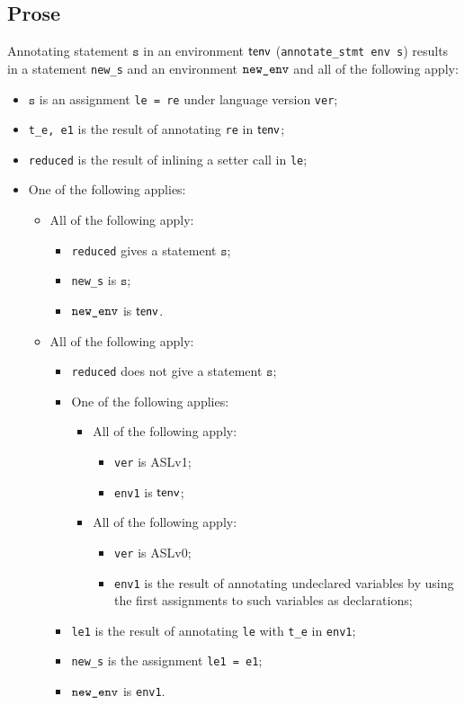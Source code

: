 \documentclass{book}
\newcommand\vs[0]{\texttt{s}}
\begin{document}
  \subsection{Prose}
Annotating statement $\vs$ in an environment $\textsf{tenv}$
(\texttt{annotate\_stmt env s}) results in a statement \texttt{new\_s} and an
environment $\texttt{new\_env}$ and all of the following apply:
   \begin{itemize}
   \item $\vs$ is an assignment \texttt{le = re} under language version \texttt{ver};
   \item \texttt{t\_e, e1} is the result of annotating \texttt{re} in $\textsf{tenv}$;
   \item \texttt{reduced} is the result of inlining a setter call in \texttt{le};
   \item One of the following applies:
     \begin{itemize}
     \item All of the following apply:
       \begin{itemize}
       \item \texttt{reduced} gives a statement $\vs$;
       \item \texttt{new\_s} is $\vs$;
       \item $\texttt{new\_env}$ is $\textsf{tenv}$.
       \end{itemize}

     \item All of the following apply:
       \begin{itemize}
       \item \texttt{reduced} does not give a statement $\vs$;
       \item One of the following applies:
         \begin{itemize}
         \item All of the following apply:
           \begin{itemize}
           \item \texttt{ver} is ASLv1;
           \item \texttt{env1} is $\textsf{tenv}$;
           \end{itemize}
         \item All of the following apply:
           \begin{itemize}
           \item \texttt{ver} is ASLv0;
	   \item \texttt{env1} is the result of annotating undeclared variables by using
	      the first assignments to such variables as declarations;
           \end{itemize}
         \end{itemize}

       \item \texttt{le1} is the result of annotating \texttt{le} with \texttt{t\_e} in \texttt{env1};
       \item \texttt{new\_s} is the assignment \texttt{le1 = e1};
       \item $\texttt{new\_env}$ is \texttt{env1}.
       \end{itemize}
    \end{itemize}
  \end{itemize}
\end{document}
